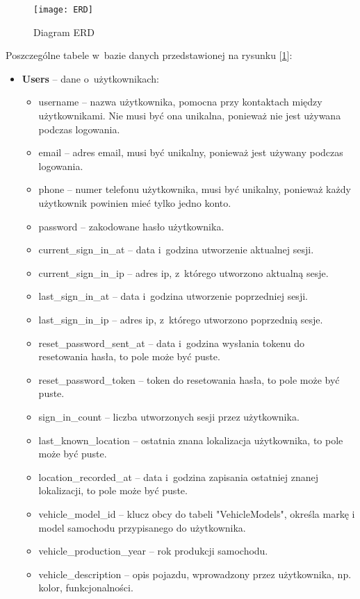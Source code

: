 \documentclass[eng,archivemode]{mgr}
\begin{document}
\begin{figure}[H]
	\centering
	\texttt{[image: ERD]}
	\caption{Diagram ERD}
	\label{fig:erd}
\end{figure}

Poszczególne tabele w~bazie danych przedstawionej na rysunku [\ref{fig:erd}]:
\begin{itemize}
	\item \textbf{Users} -- dane o~użytkownikach:
	\begin{itemize}
		\item username -- nazwa użytkownika, pomocna przy kontaktach między użytkownikami. Nie musi być ona unikalna, ponieważ nie jest używana podczas logowania.
		\item email -- adres email, musi być unikalny, ponieważ jest używany podczas logowania.
		\item phone -- numer telefonu użytkownika, musi być unikalny, ponieważ każdy użytkownik powinien mieć tylko jedno konto.
		\item password -- zakodowane hasło użytkownika.
		\item current\_sign\_in\_at -- data i~godzina utworzenie aktualnej sesji.
		\item current\_sign\_in\_ip -- adres ip, z~którego utworzono aktualną sesje.
		\item last\_sign\_in\_at -- data i~godzina utworzenie poprzedniej sesji.
		\item last\_sign\_in\_ip -- adres ip, z~którego utworzono poprzednią sesje.
		\item reset\_password\_sent\_at -- data i~godzina wysłania tokenu do resetowania hasła, to pole może być puste.
		\item reset\_password\_token -- token do resetowania hasła, to pole może być puste.
		\item sign\_in\_count -- liczba utworzonych sesji przez użytkownika.
		\item last\_known\_location -- ostatnia znana lokalizacja użytkownika, to pole może być puste.
		\item location\_recorded\_at -- data i~godzina zapisania ostatniej znanej lokalizacji, to pole może być puste.
		\item vehicle\_model\_id -- klucz obcy do tabeli "VehicleModels", określa markę i model samochodu przypisanego do użytkownika.
		\item vehicle\_production\_year -- rok produkcji samochodu.
		\item vehicle\_description -- opis pojazdu, wprowadzony przez użytkownika, np. kolor, funkcjonalności.

\end{itemize}
\end{itemize}
\end{document}
